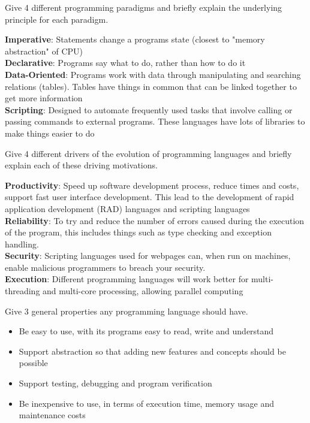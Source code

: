 \documentclass[addpoints]{exam}
\begin{document}
\begin{questions}
\question[6]Give 4 different programming paradigms and briefly explain the underlying
principle for each paradigm.
\begin{solution}[2in]
	\textbf{Imperative}: Statements change a programs state (closest to "memory abstraction" of CPU)\\
	\textbf{Declarative}: Programs say what to do, rather than how to do it\\
	\textbf{Data-Oriented}: Programs work with data through manipulating and searching relations (tables). Tables have things in common that can be linked together to get more information\\
	\textbf{Scripting}: Designed to automate frequently used tasks that involve calling or passing commands to external programs. These languages have lots of libraries to make things easier to do
\end{solution}

\question[4]Give 4 different drivers of the evolution of programming languages and
briefly explain each of these driving motivations.
\begin{solution}[2in]
	\textbf{Productivity}: Speed up software development process, reduce times and costs, support fast user interface development. This lead to the development of rapid application development (RAD) languages and scripting languages\\
	\textbf{Reliability}: To try and reduce the number of errors caused during the execution of the program, this includes things such as type checking and exception handling.\\
	\textbf{Security}: Scripting languages used for webpages can, when run on machines, enable malicious programmers to breach your security.\\
	\textbf{Execution}: Different programming languages will work better for multi-threading and multi-core processing, allowing parallel computing\\
\end{solution}

\question[3]Give 3 general properties any programming language should have.
\begin{solution}[2in]
	\begin{itemize}
		\item Be easy to use, with its programs easy to read, write and understand
		\item Support abstraction so that adding new features and concepts should be possible
		\item Support testing, debugging and program verification
		\item Be inexpensive to use, in terms of execution time, memory usage and maintenance costs
	\end{itemize}
\end{solution}


\end{questions}
\end{document}
